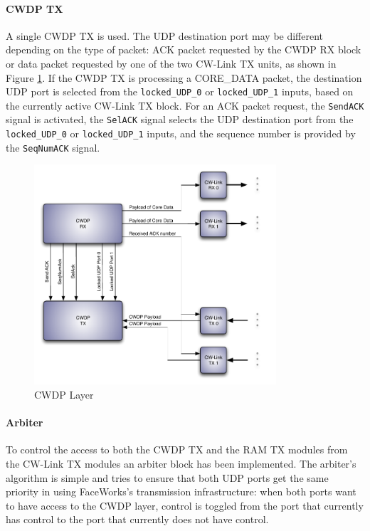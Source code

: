 \documentclass[conference]{IEEEtran}
\begin{document}
\paragraph*{CWDP TX} A single CWDP TX is used. The UDP destination port may be different depending on the type of packet: ACK packet requested by the CWDP RX block or data packet requested by one of the two CW-Link TX units, as shown in Figure \ref{fig:CWDPSIMP2}. If the CWDP TX is processing a CORE\_DATA packet, the destination UDP port is selected from the \texttt{locked\_UDP\_0} or \texttt{locked\_UDP\_1} inputs, based on the currently active CW-Link TX block. For an ACK packet request, the {\tt SendACK} signal is activated, the {\tt SelACK} signal selects the UDP destination port from the \texttt{locked\_UDP\_0} or \texttt{locked\_UDP\_1} inputs, and the sequence number is provided by the {\tt SeqNumACK} signal.

\begin{figure}[h]
  \centering
      \includegraphics[width=9cm,center]{Diagrams/CWDP-simplified-transaction-2.pdf}
  \caption{CWDP Layer}\label{fig:CWDPSIMP2}
\end{figure}

\paragraph*{Arbiter} To control the access to both the CWDP TX and the RAM TX modules from the CW-Link TX modules an arbiter block has been implemented. The arbiter's algorithm is simple and tries to ensure that both UDP ports get the same priority in using FaceWorks's transmission infrastructure: when both ports want to have access to the CWDP layer, control is toggled from the port that currently has control to the port that currently does not have control.
\end{document}
